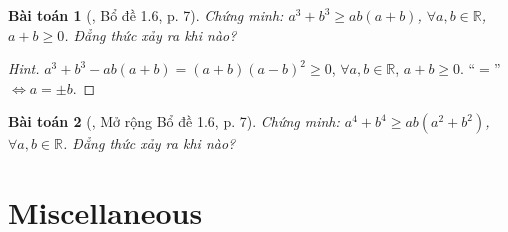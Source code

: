 \documentclass{article}
\newtheorem{baitoan}{Bài toán}
\begin{document}
\begin{baitoan}[\cite{Son_Nghiep_Trung_Can2021}, Bổ đề 1.6, p. 7]
	Chứng minh: $a^3 + b^3\ge ab(a + b)$, $\forall a,b\in\mathbb{R}$, $a + b\ge 0$. Đẳng thức xảy ra khi nào?
\end{baitoan}

\begin{proof}[Hint]
	$a^3 + b^3 - ab(a + b) = (a + b)(a - b)^2\ge 0$, $\forall a,b\in\mathbb{R}$, $a + b\ge 0$. ``$=$'' $\Leftrightarrow a = \pm b$.
\end{proof}

\begin{baitoan}[\cite{Son_Nghiep_Trung_Can2021}, Mở rộng Bổ đề 1.6, p. 7]
	Chứng minh: $a^4 + b^4\ge ab(a^2 + b^2)$, $\forall a,b\in\mathbb{R}$. Đẳng thức xảy ra khi nào?
\end{baitoan}


\section{Miscellaneous}


\printbibliography[heading=bibintoc]
	
\end{document}
